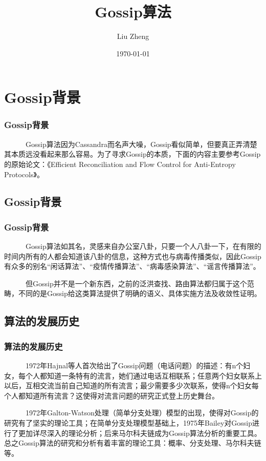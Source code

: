 \documentclass[slidestop,compress,mathserif,c]{beamer}
\title{Gossip算法}
\author{Liu Zheng}
\date{\today}
\institute{同济大学电信学院}
\begin{document}
\frame{\titlepage}

\section{Gossip背景}

\begin{frame}
\frametitle{Gossip背景}
~~~~~~Gossip算法因为Cassandra而名声大噪，Gossip看似简单，但要真正弄清楚其本质远没看起来那么容易。为了寻求Gossip的本质，下面的内容主要参考Gossip的原始论文：《Efficient Reconciliation and Flow Control for Anti-Entropy Protocols》。
\end{frame}

\subsection{\hfill  Gossip背景}
\begin{frame}
\frametitle{Gossip背景}
~~~~~~Gossip算法如其名，灵感来自办公室八卦，只要一个人八卦一下，在有限的时间内所有的人都会知道该八卦的信息，这种方式也与病毒传播类似，因此Gossip有众多的别名“闲话算法”、“疫情传播算法”、“病毒感染算法”、“谣言传播算法”。

~~~~~~但Gossip并不是一个新东西，之前的泛洪查找、路由算法都归属于这个范畴，不同的是Gossip给这类算法提供了明确的语义、具体实施方法及收敛性证明。
\end{frame}


\subsection{\hfill 算法的发展历史}
\begin{frame}
\frametitle{算法的发展历史}
~~~~~~1972年Hajnal等人首次给出了Gossip问题（电话问题）的描述：有n个妇女，每个人都知道一条特有的流言，她们通过电话互相联系；任意两个妇女联系上以后，互相交流当前自己知道的所有流言；最少需要多少次联系，使得n个妇女每个人都知道所有流言？这使得对流言问题的研究正式登上历史舞台。
 
~~~~~~1972年Galton-Watson处理（简单分支处理）模型的出现，使得对Gossip的研究有了坚实的理论工具；在简单分支处理模型基础上，1975年Bailey对Gossip进行了更加详尽深入的理论分析；后来马尔科夫链成为Gossip算法分析的重要工具。总之Gossip算法的研究和分析有着丰富的理论工具：概率、分支处理、马尔科夫链等。
\end{frame}
\end{document}
